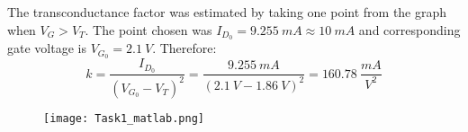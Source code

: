 The transconductance factor was estimated by taking one point from the graph when $V_G > V_T$. The point chosen was $I_{D_0}  = 9.255 \ mA  \approx 10 \ mA$ and corresponding gate voltage is $V_{G_0} = 2.1 \ V$. Therefore: $$ k = \dfrac{I_{D_0}}{(V_{G_0}-V_T)^2} = \dfrac{9.255 \ mA}{(2.1 \ V - 1.86 \ V)^2} = 160.78 \ \dfrac{mA}{V^2} $$

\begin{figure}[h!]
        \centering
        \texttt{[image: Task1\_matlab.png]}
\end{figure}

\pagebreak